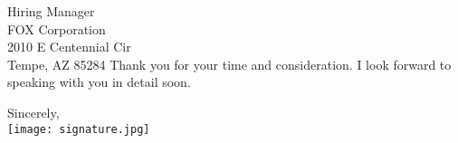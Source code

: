 \documentclass[letterpaper,12pt]{letter}
\begin{document}
\begin{letter}{%
    Hiring Manager \\ 
	FOX Corporation \\
	2010 E Centennial Cir \\
	Tempe, AZ 85284
}
Thank you for your time and consideration. I look forward to speaking with you in detail soon.

\closing{Sincerely, \\
\vspace{10pt}
\texttt{[image: signature.jpg]}}


\end{letter}

\end{document}
